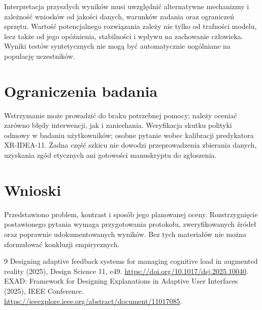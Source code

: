 \documentclass[11pt,a4paper]{article}
\begin{document}
Interpretacja przyszłych wyników musi uwzględnić alternatywne mechanizmy i zależność wniosków od jakości danych, warunków zadania oraz ograniczeń sprzętu. Wartość potencjalnego rozwiązania zależy nie tylko od trafności modelu, lecz także od jego opóźnienia, stabilności i wpływu na zachowanie człowieka. Wyniki testów syntetycznych nie mogą być automatycznie uogólniane na populację uczestników.

\section{Ograniczenia badania}

Wstrzymanie może prowadzić do braku potrzebnej pomocy; należy oceniać zarówno błędy interwencji, jak i zaniechania. Weryfikacja skutku polityki odmowy w badaniu użytkowników; osobne pytanie wobec kalibracji predykatora XR-IDEA-11. Żadna część szkicu nie dowodzi przeprowadzenia zbierania danych, uzyskania zgód etycznych ani gotowości manuskryptu do zgłoszenia.

\section{Wnioski}

Przedstawiono problem, kontrast i sposób jego planowanej oceny. Rozstrzygnięcie postawionego pytania wymaga przygotowania protokołu, zweryfikowanych źródeł oraz poprawnie udokumentowanych wyników. Bez tych materiałów nie można sformułować konkluzji empirycznych.

\begin{thebibliography}{9}
 Designing adaptive feedback systems for managing cognitive load in augmented reality (2025), Design Science 11, e49. \url{https://doi.org/10.1017/dsj.2025.10040}.
 EXAD: Framework for Designing Explanations in Adaptive User Interfaces (2025), IEEE Conference. \url{https://ieeexplore.ieee.org/abstract/document/11017085}.
\end{thebibliography}
\end{document}
